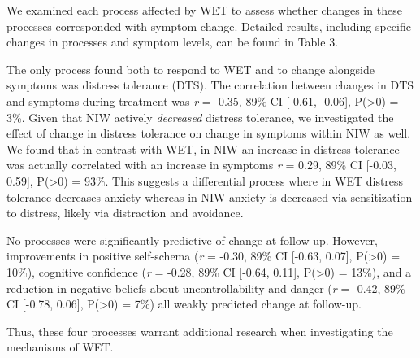 \documentclass[
  man,floatsintext]{apa7}
\begin{document}
We examined each process affected by WET to assess whether changes in these processes corresponded with symptom change.
Detailed results, including specific changes in processes and symptom levels, can be found in Table 3.

The only process found both to respond to WET and to change alongside symptoms was distress tolerance (DTS).
The correlation between changes in DTS and symptoms during treatment was \emph{r} = -0.35, 89\% CI {[}-0.61, -0.06{]}, P(\textgreater0) = 3\%.
Given that NIW actively \emph{decreased} distress tolerance, we investigated the effect of change in distress tolerance on change in symptoms within NIW as well.
We found that in contrast with WET, in NIW an increase in distress tolerance was actually correlated with an increase in symptoms \emph{r} = 0.29, 89\% CI {[}-0.03, 0.59{]}, P(\textgreater0) = 93\%.
This suggests a differential process where in WET distress tolerance decreases anxiety whereas in NIW anxiety is decreased via sensitization to distress, likely via distraction and avoidance.

No processes were significantly predictive of change at follow-up.
However, improvements in positive self-schema (\emph{r} = -0.30, 89\% CI {[}-0.63, 0.07{]}, P(\textgreater0) = 10\%), cognitive confidence (\emph{r} = -0.28, 89\% CI {[}-0.64, 0.11{]}, P(\textgreater0) = 13\%), and a reduction in negative beliefs about uncontrollability and danger (\emph{r} = -0.42, 89\% CI {[}-0.78, 0.06{]}, P(\textgreater0) = 7\%) all weakly predicted change at follow-up.

Thus, these four processes warrant additional research when investigating the mechanisms of WET.
\end{document}
